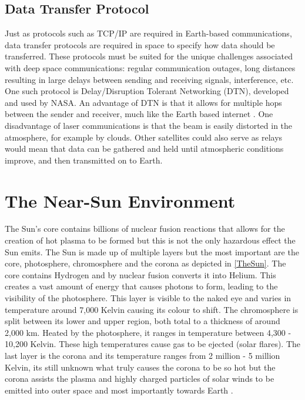 \documentclass[12pt]{article}
\begin{document}
\subsection{Data Transfer Protocol}

Just as protocols such as TCP/IP are required in Earth-based communications, data transfer protocols are required in space to specify how data should be transferred. These protocols must be suited for the unique challenges associated with deep space communications: regular communication outages, long distances resulting in large delays between sending and receiving signals, interference, etc. One such protocol is Delay/Disruption Tolerant Networking (DTN), developed and used by NASA. An advantage of DTN is that it allows for multiple hops between the sender and receiver, much like the Earth based internet \cite{dsnnasa}. One disadvantage of laser communications is that the beam is easily distorted in the atmosphere, for example by clouds. Other satellites could also serve as relays would mean that data can be gathered and held until atmospheric conditions improve, and then transmitted on to Earth. 

\section{The Near-Sun Environment}
\label{The Near-Sun Environment}

The Sun's core contains billions of nuclear fusion reactions that allows for the creation of hot plasma to be formed but this is not the only hazardous effect the Sun emits. The Sun is made up of multiple layers but the most important are the core, photosphere, chromosphere and the corona as depicted in \cref{TheSun}. The core contains Hydrogen and by nuclear fusion converts it into Helium. This creates a vast amount of energy that causes photons to form, leading to the visibility of the photosphere. This layer is visible to the naked eye and varies in temperature around 7,000 Kelvin causing its colour to shift. The chromosphere is split between its lower and upper region, both total to a thickness of around 2,000 km. Heated by the photosphere, it ranges in temperature between 4,300 - 10,200 Kelvin. These high temperatures cause gas to be ejected (solar flares). The last layer is the corona and its temperature ranges from 2 million - 5 million Kelvin, its still unknown what truly causes the corona to be so hot but the corona assists the plasma and highly charged particles of solar winds to be emitted into outer space and most importantly towards Earth \cite{TheSun}. \\
\end{document}

